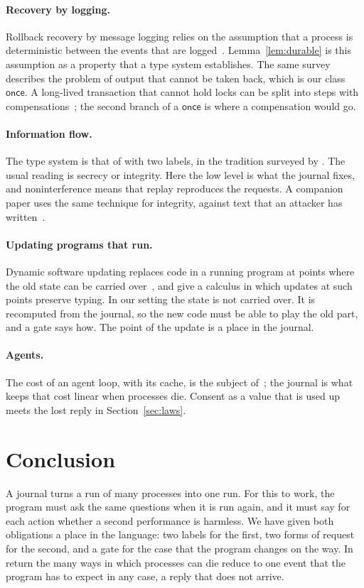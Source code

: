 \documentclass[acmsmall,nonacm,screen]{acmart}
\newcommand{\kw}[1]{\mathsf{#1}}
\newcommand{\onceclass}{\kw{once}}
\begin{document}
\paragraph{Recovery by logging.} Rollback recovery by message logging relies on the
assumption that a process is deterministic between the events that are
logged~\citep{elnozahy2002}. Lemma~\ref{lem:durable} is this assumption as a property that a
type system establishes. The same survey describes the problem of output that cannot be
taken back, which is our class $\onceclass$. A long-lived transaction that cannot hold locks
can be split into steps with compensations~\citep{garciamolina1987}; the second branch of a
$\kw{once}$ is where a compensation would go.

\paragraph{Information flow.} The type system is that of \citet{volpano1996} with two labels,
in the tradition surveyed by \citet{sabelfeld2003}. The usual reading is secrecy or
integrity. Here the low level is what the journal fixes, and noninterference means that
replay reproduces the requests. A companion paper uses the same technique for integrity,
against text that an attacker has written~\citep{tpp7}.

\paragraph{Updating programs that run.} Dynamic software updating replaces code in a running
program at points where the old state can be carried over~\citep{hicks2005}, and
\citet{stoyle2005} give a calculus in which updates at such points preserve typing. In our
setting the state is not carried over. It is recomputed from the journal, so the new code must
be able to play the old part, and a gate says how. The point of the update is a place in the
journal.

\paragraph{Agents.} The cost of an agent loop, with its cache, is the subject
of~\citet{tpp6}; the journal is what keeps that cost linear when processes die. Consent as a
value that is used up~\citep{tpp4} meets the lost reply in Section~\ref{sec:laws}.

\section{Conclusion}

A journal turns a run of many processes into one run. For this to work, the program must ask
the same questions when it is run again, and it must say for each action whether a second
performance is harmless. We have given both obligations a place in the language: two labels
for the first, two forms of request for the second, and a gate for the case that the program
changes on the way. In return the many ways in which processes can die reduce to one event
that the program has to expect in any case, a reply that does not arrive.



\end{document}
